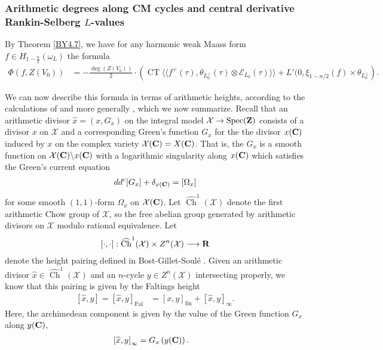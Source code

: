 \documentclass{amsart}
\theoremstyle{definition}
\theoremstyle{definition}
\theoremstyle{definition}
\begin{document}
\subsubsection{Arithmetic degrees along CM cycles and central derivative Rankin-Selberg $L$-values}

By Theorem \ref{BY4.7}, we have for any harmonic weak Maass form $f \in H_{1- \frac{n}{2}}(\omega_L)$ the formula
\begin{align}\label{BYf} \Phi(f, Z(V_0)) &= - \frac{\operatorname{deg}(Z(V_0))}{2} \cdot \left( 
\operatorname{CT} \langle \langle f^+(\tau), \theta_{L_0^{\perp}}(\tau) \otimes \mathcal{E}_{L_0}(\tau) \rangle \rangle 
+ L'(0, \xi_{1- n/2}(f) \times \theta_{L_0^{\perp}} \right).  \end{align}

We can now describe this formula in terms of arithmetic heights, according to the calculations of \cite[$\S$5-6]{BY} 
and more generally \cite[Theorem A]{AGHMP}, which we now summarize. Recall that an arithmetic divisor 
$\widehat{x} = (x, G_x)$ on the integral model $\mathcal{X} \rightarrow \operatorname{Spec}({\bf{Z}})$ consists 
of a divisor $x$ on $\mathcal{X}$ and a corresponding Green's function $G_x$ for the the divisor $x({\bf{C}})$ 
induced by $x$ on the complex variety $\mathcal{X}({\bf{C}} ) = X({\bf{C}})$. That is, the $G_x$ is a smooth 
function on $\mathcal{X}({\bf{C}}) \backslash x({\bf{C}})$ with a logarithmic singularity along $x({\bf{C}})$ 
which satisfies the Green's current equation \begin{align*} d d^c [G_x] + \delta_{x({\bf{C}})} = [\Omega_x] \end{align*}
for some smooth $(1,1)$-form $\Omega_x$ on $\mathcal{X}({\bf{C}})$.
Let $\widehat{\operatorname{Ch}}^1(\mathcal{X})$ denote the first arithmetic Chow group of $\mathcal{X}$,
so the free abelian group generated by arithmetic divisors on $\mathcal{X}$ modulo rational equivalence. Let
\begin{align*} \left[ \cdot, \cdot \right]: \widehat{\operatorname{Ch}}^1(\mathcal{X}) \times Z^n(\mathcal{X}) \longrightarrow {\bf{R}}\end{align*}
denote the height pairing defined in Bost-Gillet-Soul\'e \cite[$\S$ 2.3]{BGS}.
Given an arithmetic divisor $\widehat{x}  \in \widehat{\operatorname{Ch}}^1(\mathcal{X})$
and an $n$-cycle $y \in Z^n(\mathcal{X})$ intersecting properly, we know that this pairing is given by the Faltings height 
\begin{align*} \left[ \widehat{x}, y\right] = \left[ \widehat{x}, y \right]_{\operatorname{Fal}} 
&= \left[ x, y \right]_{\operatorname{fin}} + \left[ \widehat{x}, y\right]_{\infty}.\end{align*}
Here, the archimedean component is given by the value of the Green function $G_x$ along $y({\bf{C}})$, 
\begin{align*} \left[ \widehat{x}, y\right]_{\infty} &= G_x \left( y({\bf{C}}) \right). \end{align*}
\end{document}

